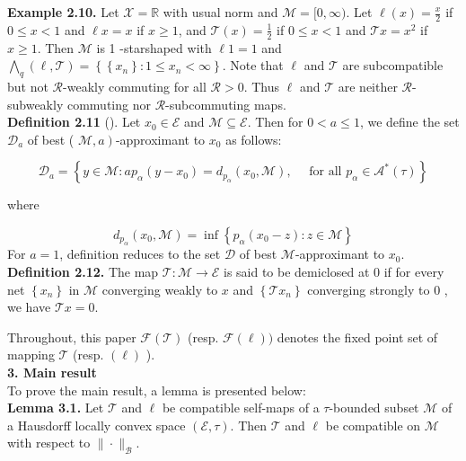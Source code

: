 \documentclass[12pt,a4paper,two side]{article}
\begin{document}
\textbf{Example 2.10.} Let $\mathcal{X}=\mathbb{R}$ with usual norm and $\mathcal{M}=[0, \infty)$. Let $\ell(x)=\frac{x}{2}$ if $0 \leq x<1$ and $\ell x=x$ if $x \geq 1$, and $\mathcal{T}(x)=\frac{1}{2}$ if $0 \leq x<1$ and $\mathcal{T} x=x^2$ if $x \geq 1$. Then $\mathcal{M}$ is 1 -starshaped with $\ell 1=1$ and $\bigwedge_q(\ell, \mathcal{T})=\left\{\left\{x_n\right\}: 1 \leq x_n<\infty\right\}$. Note that $\ell$ and $\mathcal{T}$ are subcompatible but not $\mathcal{R}$-weakly commuting for all $\mathcal{R}>0$. Thus $\ell$ and $\mathcal{T}$ are neither $\mathscr{R}$-subweakly commuting nor $\mathcal{R}$-subcommuting maps.\\

\textbf{Definition 2.11} (\cite{citation-key9}). Let $x_0 \in \mathcal{E}$ and $\mathcal{M} \subseteq \mathcal{E}$. Then for $0<a \leq 1$, we define the set $\mathscr{D}_a$ of best ( $\left.\mathcal{M}, a\right)$-approximant to $x_0$ as follows:

$$
\mathscr{D}_a=\left\{y \in \mathcal{M}: a p_\alpha\left(y-x_0\right)=d_{p_\alpha}\left(x_0, \mathcal{M}\right), \quad \text { for all } p_\alpha \in \mathcal{A}^*(\tau)\right\}
$$

where

$$
d_{p_\alpha}\left(x_0, \mathcal{M}\right)=\inf \left\{p_\alpha\left(x_0-z\right): z \in \mathcal{M}\right\}
$$
For $a=1$, definition reduces to the set $\mathscr{D}$ of best $\mathcal{M}$-approximant to $x_0$.\\

\textbf{Definition 2.12.} The map $\mathcal{T}: \mathcal{M} \rightarrow \mathcal{E}$ is said to be demiclosed at 0 if for every net $\left\{x_n\right\}$ in $\mathcal{M}$ converging weakly to $x$ and $\left\{\mathcal{T} x_n\right\}$ converging strongly to 0 , we have $\mathcal{T} x=0$.

Throughout, this paper $\mathcal{F}(\mathcal{T})$ (resp. $\mathcal{F}(\ell))$ denotes the fixed point set of mapping $\mathcal{T}$ (resp. $(\ell)$ ).\\


\textbf{3. Main result}\\

To prove the main result, a lemma is presented below:\\

\hypertarget{muc3.1}{\textbf{Lemma 3.1.}} Let $\mathcal{T}$ and $\ell$ be compatible self-maps of a $\tau$-bounded subset $\mathcal{M}$ of a Hausdorff locally convex space $(\mathcal{E}, \tau)$. Then $\mathcal{T}$ and $\ell$ be compatible on $\mathcal{M}$ with respect to $\|\cdot\|_{\mathcal{B}}$.\\
\end{document}
